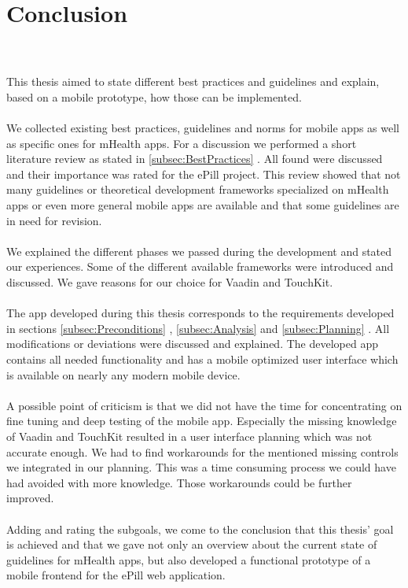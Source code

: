 \section{Conclusion}
\\
\\
This thesis aimed to state different best practices and guidelines and explain, based on a mobile prototype, how those can be implemented.
\\
\\
We collected existing best practices, guidelines and norms for mobile apps as well as specific ones for mHealth apps. For a discussion we performed a short literature review as stated in \ref{subsec:BestPractices} . All found were discussed and their importance was rated for the ePill project. This review showed that not many guidelines or theoretical development frameworks specialized on mHealth apps or even more general mobile apps are available and that some guidelines are in need for revision.
\\
\\
We explained the different phases we passed during the development and stated our experiences. Some of the different available frameworks were introduced and discussed. We gave reasons for our choice for Vaadin and TouchKit.
\\
\\
The app developed during this thesis corresponds to the requirements developed in sections \ref{subsec:Preconditions} , \ref{subsec:Analysis}  and \ref{subsec:Planning} . All modifications or deviations were discussed and explained. The developed app contains all needed functionality and has a mobile optimized user interface which is available on nearly any modern mobile device.
\\
\\
A possible point of criticism is that we did not have the time for concentrating on fine tuning and deep testing of the mobile app. Especially the missing knowledge of Vaadin and TouchKit resulted in a user interface planning which was not accurate enough. We had to find workarounds for the mentioned missing controls we integrated in our planning. This was a time consuming process we could have had avoided with more knowledge. Those workarounds could be further improved.
\\
\\
Adding and rating the subgoals, we come to the conclusion that this thesis' goal is achieved and that we gave not only an overview about the current state of guidelines for mHealth apps, but also developed a functional prototype of a mobile frontend for the ePill web application.